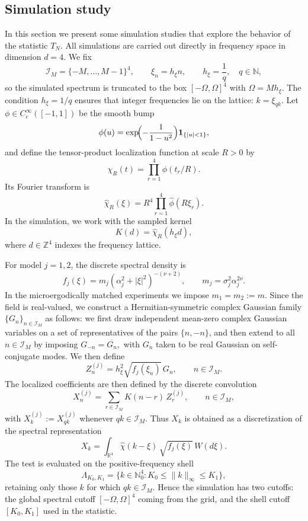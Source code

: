 \documentclass[11pt, reqno]{amsart}
\theoremstyle{remark}
\newcommand{\1}{\mathbf{1}}
\begin{document}
\subsection{Simulation study}
In this section we present some simulation studies that explore the behavior of the
statistic $T_N$.
All simulations are carried out directly in frequency space in dimension \(d=4\). We fix
\[
\mathcal I_M=\{-M,\dots,M-1\}^4,\qquad \xi_n=h_\xi n,\qquad h_\xi=\frac1q,\quad q\in\mathbb N,
\]
so the simulated spectrum is truncated to the box \([-\Omega,\Omega]^4\) with \(\Omega=Mh_\xi\).
 The condition \(h_\xi=1/q\) ensures that integer frequencies lie on the lattice: \(k=\xi_{qk}\).
Let $\phi \in C_c^\infty([-1,1])$ be the smooth bump
\[
\phi(u)=\exp\!\Bigl(-\frac{1}{1-u^2}\Bigr)\mathbf 1_{\{|u|<1\}},
\]
and define the tensor-product localization function at scale $R>0$ by
\[
\chi_R(t)=\prod_{r=1}^4 \phi(t_r / R).
\]
Its Fourier transform is
\[
\widehat{\chi}_R(\xi)=R^4 \prod_{r=1}^4 \widehat{\phi}(R \xi_r).
\]
In the simulation, we work with the sampled kernel
\[
K(d)=\widehat{\chi}_R(h_\xi d),
\]
where $d \in \mathbb{Z}^4$ indexes the frequency lattice.

For model \(j=1,2\), the discrete spectral density is
\[
f_j(\xi)=m_j(\alpha_j^2+|\xi|^2)^{-(\nu+2)},\qquad m_j=\sigma_j^2\alpha_j^{2\nu}.
\]
In the microergodically matched experiments we impose \(m_1 = m_2 := m\).
Since the field is real-valued, we construct a Hermitian-symmetric complex Gaussian family \(\{G_n\}_{n\in\mathcal I_M}\) as follows: we first draw independent mean-zero complex Gaussian variables on a set of representatives of the pairs \(\{n,-n\}\), and then extend to all \(n\in\mathcal I_M\) by imposing
$
G_{-n} = \overline{G_n},$
with \(G_n\) taken to be real Gaussian on self-conjugate modes. We then define
\[
Z_n^{(j)} = h_\xi^2 \sqrt{f_j(\xi_n)}\, G_n,
\qquad n \in \mathcal I_M.
\]
The localized coefficients are then defined by the discrete convolution
\[
X_n^{(j)}=\sum_{r\in\mathcal I_M} K(n-r)\,Z_r^{(j)},\qquad 
n\in\mathcal I_M,
\]
with \(X_k^{(j)}:=X_{qk}^{(j)}\) whenever \(qk\in\mathcal I_M\). Thus \(X_k\) is obtained as a discretization of the spectral representation
\[
X_k
=
\int_{\mathbb R^4}
\widehat{\chi}(k-\xi)\,\sqrt{f_j(\xi)}\,W(d\xi).
\]
The test is evaluated on the positive-frequency shell
\[
\Lambda_{K_0,K_1}
=
\{k\in\mathbb N_0^4: K_0\le \|k\|_\infty \le K_1\},
\]
retaining only those \(k\) for which \(qk\in\mathcal I_M\). Hence the simulation has two cutoffs: the global spectral cutoff \([-\Omega,\Omega]^4\) coming from the grid, and the shell cutoff \([K_0,K_1]\) used in the statistic.
\end{document}
